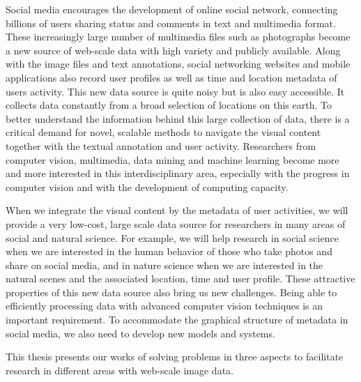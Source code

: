 Social media encourages the development of online social network, connecting billions of users sharing status and comments in text and multimedia format.
These increasingly large number of multimedia files such as photographs become a new source of web-scale data with high variety and publicly available.
Along with the image files and text annotations, social networking websites and mobile applications also record user profiles as well as time and location metadata of users activity.
This new data source is quite noisy but is also easy accessible. 
It collects data constantly from a broad selection of locations on this earth. 
To better understand the information behind this large collection of data, there is a critical demand for novel, scalable methods to navigate the visual content together with the textual annotation and user activity.
Researchers from computer vision, multimedia, data mining and machine learning become more and more interested in this interdisciplinary area, especially with the progress in computer vision and with the development of computing capacity.

When we integrate the visual content by the metadata of user activities, we will provide a very low-cost, large scale data source for researchers in many areas of social and natural science.
For example, we will help research in social science when we are interested in the human behavior of those who take photos and share on social media, and in nature science when we are interested in the natural scenes and the associated location, time and user profile.
These attractive properties of this new data source also bring us new challenges. 
Being able to efficiently processing data with advanced computer vision techniques is an important requirement.
To accommodate the graphical structure of metadata in social media, we also need to develop new models and systems.

This thesis presents our works of solving problems in three aspects to facilitate research in different areas with web-scale image data.



